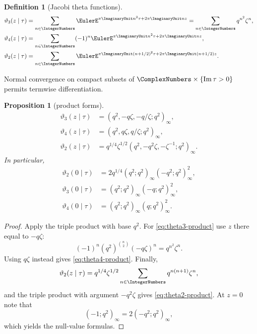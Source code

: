 \documentclass[11pt,oneside]{article}
\newtheorem{proposition}[theorem]{Proposition}
\theoremstyle{definition}
\newtheorem{definition}[theorem]{Definition}
\begin{document}
\begin{definition}[Jacobi theta functions]
\begin{align}
 \vartheta_3(z\mid\tau)&=\sum_{n\in\IntegerNumbers}
   \EulerE^{\pi\ImaginaryUnit n^2\tau+2\pi\ImaginaryUnit nz}
   =\sum_{n\in\IntegerNumbers}q^{n^2}\zeta^n,\label{eq:theta3-def}\\
 \vartheta_4(z\mid\tau)&=\sum_{n\in\IntegerNumbers}
   (-1)^n\EulerE^{\pi\ImaginaryUnit n^2\tau+2\pi\ImaginaryUnit nz},\label{eq:theta4-def}\\
 \vartheta_2(z\mid\tau)&=\sum_{n\in\IntegerNumbers}
   \EulerE^{\pi\ImaginaryUnit(n+1/2)^2\tau+2\pi\ImaginaryUnit(n+1/2)z}.\label{eq:theta2-def}
\end{align}
\end{definition}

Normal convergence on compact subsets of $\ComplexNumbers\times\{\operatorname{Im}\tau>0\}$ permits termwise differentiation.

\begin{proposition}[product forms]\label{prop:theta-products}
\begin{align}
 \vartheta_3(z\mid\tau)
 &=(q^2,-q\zeta,-q/\zeta;q^2)_\infty,\label{eq:theta3-product}\\
 \vartheta_4(z\mid\tau)
 &=(q^2,q\zeta,q/\zeta;q^2)_\infty,\label{eq:theta4-product}\\
 \vartheta_2(z\mid\tau)
 &=q^{1/4}\zeta^{1/2}
   (q^2,-q^2\zeta,-\zeta^{-1};q^2)_\infty.\label{eq:theta2-product}
\end{align}
In particular,
\begin{align}
 \vartheta_2(0\mid\tau)
 &=2q^{1/4}(q^2;q^2)_\infty(-q^2;q^2)_\infty^2,\label{eq:theta2-null}\\
 \vartheta_3(0\mid\tau)
 &=(q^2;q^2)_\infty(-q;q^2)_\infty^2,\label{eq:theta3-null}\\
 \vartheta_4(0\mid\tau)
 &=(q^2;q^2)_\infty(q;q^2)_\infty^2.\label{eq:theta4-null}
\end{align}
\end{proposition}

\begin{proof}
Apply the triple product with base $q^2$. For \eqref{eq:theta3-product} use $z$ there equal to $-q\zeta$:
\[
 (-1)^n(q^2)^{\binom n2}(-q\zeta)^n=q^{n^2}\zeta^n.
\]
Using $q\zeta$ instead gives \eqref{eq:theta4-product}. Finally,
\[
 \vartheta_2(z\mid\tau)
 =q^{1/4}\zeta^{1/2}\sum_{n\in\IntegerNumbers}q^{n(n+1)}\zeta^n,
\]
and the triple product with argument $-q^2\zeta$ gives
\eqref{eq:theta2-product}. At $z=0$ note that
\[
 (-1;q^2)_\infty=2(-q^2;q^2)_\infty,
\]
which yields the null-value formulas.
\end{proof}
\end{document}
